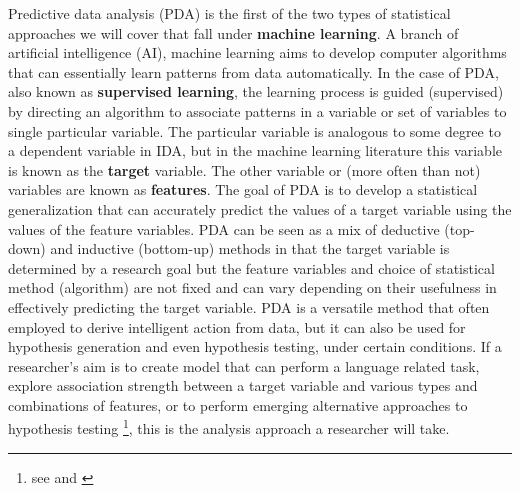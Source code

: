 \documentclass[
]{article}
\begin{document}
Predictive data analysis (PDA) is the first of the two types of statistical approaches we will cover that fall under \textbf{machine learning}. A branch of artificial intelligence (AI), machine learning aims to develop computer algorithms that can essentially learn patterns from data automatically. In the case of PDA, also known as \textbf{supervised learning}, the learning process is guided (supervised) by directing an algorithm to associate patterns in a variable or set of variables to single particular variable. The particular variable is analogous to some degree to a dependent variable in IDA, but in the machine learning literature this variable is known as the \textbf{target} variable. The other variable or (more often than not) variables are known as \textbf{features}. The goal of PDA is to develop a statistical generalization that can accurately predict the values of a target variable using the values of the feature variables. PDA can be seen as a mix of deductive (top-down) and inductive (bottom-up) methods in that the target variable is determined by a research goal but the feature variables and choice of statistical method (algorithm) are not fixed and can vary depending on their usefulness in effectively predicting the target variable. PDA is a versatile method that often employed to derive intelligent action from data, but it can also be used for hypothesis generation and even hypothesis testing, under certain conditions. If a researcher's aim is to create model that can perform a language related task, explore association strength between a target variable and various types and combinations of features, or to perform emerging alternative approaches to hypothesis testing \footnote{see \citet{Deshors2016} and \citet{Baayen2011}}, this is the analysis approach a researcher will take.
\end{document}
